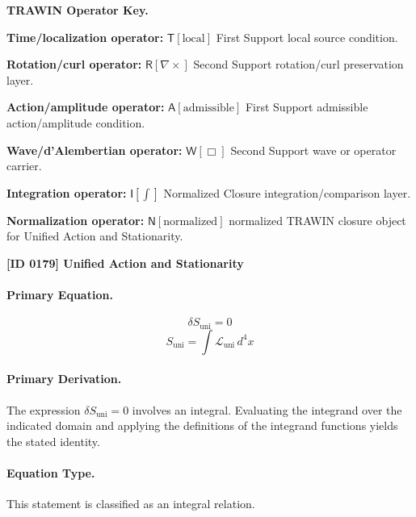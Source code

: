 \par\vspace{0.45\baselineskip}
\noindent\begin{minipage}[t]{\linewidth}
\begingroup
\small
\raggedright
\textbf{TRAWIN Operator Key.}\par
\noindent\textbf{Time/localization operator:} $\mathsf{T}\!\left[\mathrm{local}\right]$ First Support local source condition.\par
\noindent\textbf{Rotation/curl operator:} $\mathsf{R}\!\left[\nabla\times\right]$ Second Support rotation/curl preservation layer.\par
\noindent\textbf{Action/amplitude operator:} $\mathsf{A}\!\left[\mathrm{admissible}\right]$ First Support admissible action/amplitude condition.\par
\noindent\textbf{Wave/d'Alembertian operator:} $\mathsf{W}\!\left[\Box\right]$ Second Support wave or operator carrier.\par
\noindent\textbf{Integration operator:} $\mathsf{I}\!\left[\int\right]$ Normalized Closure integration/comparison layer.\par
\noindent\textbf{Normalization operator:} $\mathsf{N}\!\left[\mathrm{normalized}\right]$ normalized TRAWIN closure object for Unified Action and Stationarity.\par
\endgroup
\end{minipage}

\clearpage
\noindent\textbf{[ID 0179] Unified Action and Stationarity}\par
\vspace{0.35em}
\paragraph{Primary Equation.}
\[
\delta S_{\mathrm{uni}} = 0
\]
\[
S_{\mathrm{uni}} = \int \mathcal{L}_{\mathrm{uni}}\, d^4x
\]

\paragraph{Primary Derivation.}
The expression \( \delta S_{\mathrm{uni}} = 0 \) involves an integral. Evaluating the integrand over the indicated domain and applying the definitions of the integrand functions yields the stated identity.
\paragraph{Equation Type.}
This statement is classified as an integral relation.

